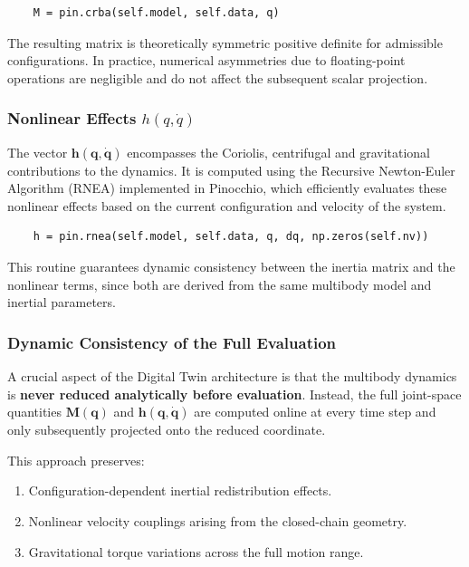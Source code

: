 \begin{verbatim}
    M = pin.crba(self.model, self.data, q)
\end{verbatim}

The resulting matrix is theoretically symmetric positive definite for admissible configurations. In practice, numerical asymmetries due to floating-point operations are negligible and do not affect the subsequent scalar projection.

\subsubsection*{Nonlinear Effects $h(q, \dot{q})$}
The vector $\textbf{h}(\textbf{q},\dot{\textbf{q}})$ encompasses the Coriolis, centrifugal and gravitational contributions to the dynamics. It is computed using the Recursive Newton-Euler Algorithm (RNEA) implemented in Pinocchio, which efficiently evaluates these nonlinear effects based on the current configuration and velocity of the system.

\begin{verbatim}
    h = pin.rnea(self.model, self.data, q, dq, np.zeros(self.nv))
\end{verbatim}

This routine guarantees dynamic consistency between the inertia matrix and the nonlinear terms, since both are derived from the same multibody model and inertial parameters.

\subsubsection*{Dynamic Consistency of the Full Evaluation}
A crucial aspect of the Digital Twin architecture is that the multibody dynamics is \textbf{never reduced analytically before evaluation}. Instead, the full joint-space quantities $\textbf{M}(\textbf{q})$ and $\textbf{h}(\textbf{q},\dot{\textbf{q}})$ are computed online at every time step and only subsequently projected onto the reduced coordinate.

This approach preserves:
\begin{enumerate}
    \item Configuration-dependent inertial redistribution effects.
    \item Nonlinear velocity couplings arising from the closed-chain geometry.
    \item Gravitational torque variations across the full motion range.
\end{enumerate}

